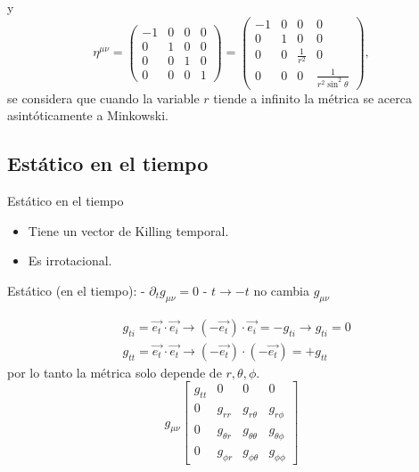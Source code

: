 y
\begin{equation}
    \eta^{\mu \nu}=\left(\begin{array}{cccc}
            -1 & 0 & 0 & 0 \\
            0  & 1 & 0 & 0 \\
            0  & 0 & 1 & 0 \\
            0  & 0 & 0 & 1
        \end{array}\right)=\left(\begin{array}{cccc}
            -1 & 0 & 0               & 0                                \\
            0  & 1 & 0               & 0                                \\
            0  & 0 & \frac{1}{r^{2}} & 0                                \\
            0  & 0 & 0               & \frac{1}{r^{2} \sin ^{2} \theta}
        \end{array}\right),
\end{equation}
se considera que cuando la variable $r$ tiende a infinito la métrica se acerca asintóticamente a Minkowski.

\subsection{Estático en el tiempo }
\begin{definition}{Estático en el tiempo}{}
    \begin{itemize}
        \item Tiene un vector de Killing temporal.
        \item Es irrotacional.
    \end{itemize}
\end{definition}
Estático (en el tiempo):
- $\partial_t g_{\mu \nu}=0$
- $t \rightarrow -t$ no cambia $g_{\mu \nu}$

\begin{align}
     & g_{t i}=\overrightarrow{e_t} \cdot \overrightarrow{e_i} \rightarrow\left(-\overrightarrow{e_t}\right) \cdot \overrightarrow{e_i}=-g_{t i}\rightarrow g_{t i}=0 \\
     & g_{t t}=\overrightarrow{e_t} \cdot \overrightarrow{e_t} \rightarrow\left(-\overrightarrow{e_t}\right) \cdot\left(-\overrightarrow{e_t}\right)=+g_{t t}
\end{align}
por lo tanto la métrica solo depende de $r, \theta, \phi$.
\begin{equation}
    g_{\mu \nu} \left[\begin{array}{cccc}
            g_{t t} & 0            & 0                 & 0      \\
            0       & g_{r r}      & g_{r \theta}      & g_{r \phi}      \\
            0       & g_{\theta r} & g_{\theta \theta} & g_{\theta \phi} \\
            0       & g_{\phi r}   & g_{\phi \theta}   & g_{\phi \phi}
        \end{array}\right]
\end{equation}

